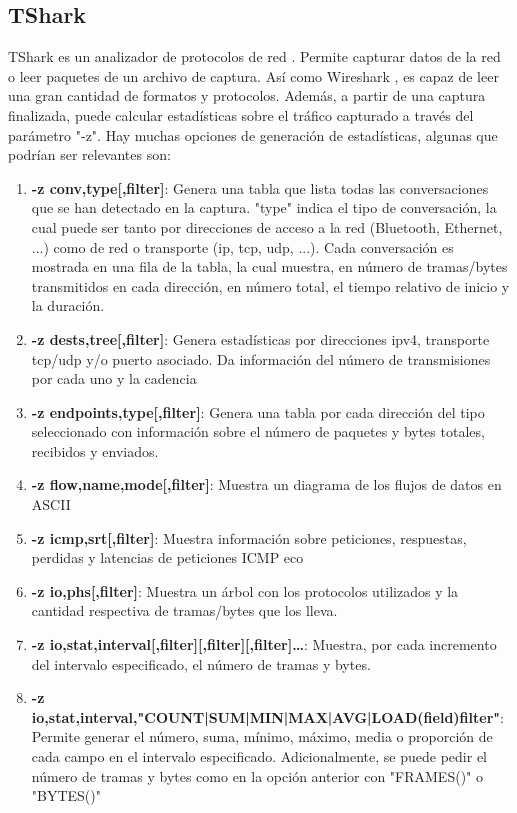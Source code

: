 \subsection{TShark}

TShark es un analizador de protocolos de red \cite{tsharkmanual}. Permite capturar datos de la red o leer paquetes de un archivo de captura. Así como Wireshark \cite{wsharkmanual}, es capaz de leer una gran cantidad de formatos y protocolos. Además, a partir de una captura finalizada, puede calcular estadísticas sobre el tráfico capturado a través del parámetro "-z". Hay muchas opciones de generación de estadísticas, algunas que podrían ser relevantes son:

\begin{enumerate} 
    \item \textbf{-z conv,type[,filter]}: Genera una tabla que lista todas las conversaciones que se han detectado en la captura. "type" indica el tipo de conversación, la cual puede ser tanto por direcciones de acceso a la red (Bluetooth, Ethernet, ...) como de red o transporte (ip, tcp, udp, ...). Cada conversación es mostrada en una fila de la tabla, la cual muestra, en número de tramas/bytes transmitidos en cada dirección, en número total, el tiempo relativo de inicio y la duración.
    \item \textbf{-z dests,tree[,filter]}: Genera estadísticas por direcciones ipv4, transporte tcp/udp y/o puerto asociado. Da información del número de transmisiones por cada uno y la cadencia
    \item \textbf{-z endpoints,type[,filter]}: Genera una tabla por cada dirección del tipo seleccionado con información sobre el número de paquetes y bytes totales, recibidos y enviados.
    \item \textbf{-z flow,name,mode[,filter]}: Muestra un diagrama de los flujos de datos en ASCII
    \item \textbf{-z icmp,srt[,filter]}: Muestra información sobre peticiones, respuestas, perdidas y latencias de peticiones ICMP eco
    \item \textbf{-z io,phs[,filter]}: Muestra un árbol con los protocolos utilizados y la cantidad respectiva de tramas/bytes que los lleva.
    \item \textbf{-z io,stat,interval[,filter][,filter][,filter]…​}: Muestra, por cada incremento del intervalo especificado, el número de tramas y bytes. 
    \item \textbf{-z io,stat,interval,"COUNT|SUM|MIN|MAX|AVG|LOAD(field)filter"}: Permite generar el número, suma, mínimo, máximo, media o proporción de cada campo en el intervalo especificado. Adicionalmente, se puede pedir el número de tramas y bytes como en la opción anterior con "FRAMES()" o "BYTES()"

\end{enumerate}
